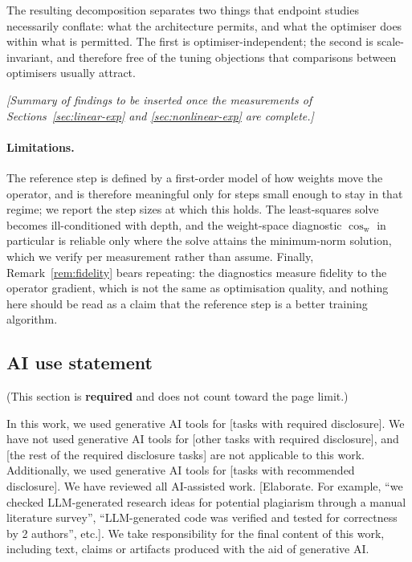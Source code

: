 \documentclass{article} %
\theoremstyle{plain}
\theoremstyle{definition}
\theoremstyle{remark}
\begin{document}
The resulting decomposition separates two things that endpoint studies necessarily conflate: what
the architecture permits, and what the optimiser does within what is permitted. The first is
optimiser-independent; the second is scale-invariant, and therefore free of the tuning objections
that comparisons between optimisers usually attract.

\emph{[Summary of findings to be inserted once the measurements of
Sections~\ref{sec:linear-exp} and \ref{sec:nonlinear-exp} are complete.]}

\paragraph{Limitations.}
The reference step is defined by a first-order model of how weights move the operator, and is
therefore meaningful only for steps small enough to stay in that regime; we report the step sizes
at which this holds. The least-squares solve becomes ill-conditioned with depth, and the
weight-space diagnostic $\cos_{\mathrm{w}}$ in particular is reliable only where the solve attains
the minimum-norm solution, which we verify per measurement rather than assume. Finally,
Remark~\ref{rem:fidelity} bears repeating: the diagnostics measure fidelity to the operator
gradient, which is not the same as optimisation quality, and nothing here should be read as a claim
that the reference step is a better training algorithm.

\newpage
\subsection*{AI use statement}

(This section is \textbf{required} and does not count toward the page limit.)

In this work, we used generative AI tools for [tasks with required disclosure].
We have not used generative AI tools for [other tasks with required disclosure],
and [the rest of the required disclosure tasks] are not applicable to this work.
Additionally, we used generative AI tools for [tasks with recommended
disclosure]. We have reviewed all AI-assisted work. [Elaborate. For example, “we
checked LLM-generated research ideas for potential plagiarism through a manual
literature survey”, “LLM-generated code was verified and tested for correctness
by 2 authors”, etc.]. We take responsibility for the final content of this work,
including text, claims or artifacts produced with the aid of generative AI.
\end{document}
